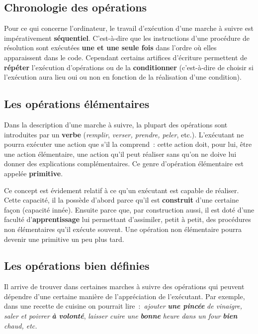 	\subsection{Chronologie des opérations}

		Pour ce qui concerne l’ordinateur, le travail d’exécution d’une marche à
		suivre est impérativement \textbf{séquentiel}. C’est-à-dire que les
		instructions d’une procédure de résolution sont exécutées \textbf{une
		et une seule fois} dans l’ordre où elles apparaissent dans le code.
		Cependant certains artifices d’écriture permettent de \textbf{répéter}
		l’exécution d’opérations ou de la \textbf{conditionner}
		(c’est-à-dire de choisir si
		l’exécution aura lieu oui ou non en fonction de la
		réalisation d’une condition).

	\subsection{Les opérations élémentaires}


		Dans la description d’une marche à suivre, la plupart des opérations
		sont introduites par un \textbf{verbe
		}(\textit{remplir}, \textit{verser, prendre, peler},
		etc.). L’exécutant ne pourra exécuter une action que s’il la comprend~:
		cette action doit, pour lui, être une action élémentaire, une action
		qu’il peut réaliser sans qu’on ne doive lui donner des explications
		complémentaires. Ce genre d’opération élémentaire est appelée
		\textbf{primitive}.
		
		Ce concept est évidement relatif à ce qu’un exécutant est capable de
		réaliser. Cette capacité, il la possède d’abord parce qu’il est
		\textbf{construit} d’une certaine façon (capacité innée). Ensuite parce
		que, par construction aussi, il est doté d’une faculté
		d’\textbf{apprentissage} lui permettant d’assimiler, petit à petit, des
		procédures non élémentaires qu’il exécute souvent. Une opération non
		élémentaire pourra devenir une primitive un peu plus tard.
		
	\subsection{Les opérations bien définies}

		Il arrive de trouver dans certaines marches à suivre des opérations qui
		peuvent dépendre d’une certaine manière de l’appréciation de
		l’exécutant. Par exemple, dans une recette de cuisine on pourrait 
		lire~:~\textit{ajouter} \textbf{\textit{une pincée}} \textit{de vinaigre,
		saler et poivrer} \textbf{\textit{à volonté}}, \textit{laisser cuire
		une} \textbf{\textit{bonne}}\textit{ heure dans un four
		}\textbf{\textit{bien}} \textit{chaud, etc.}
		
